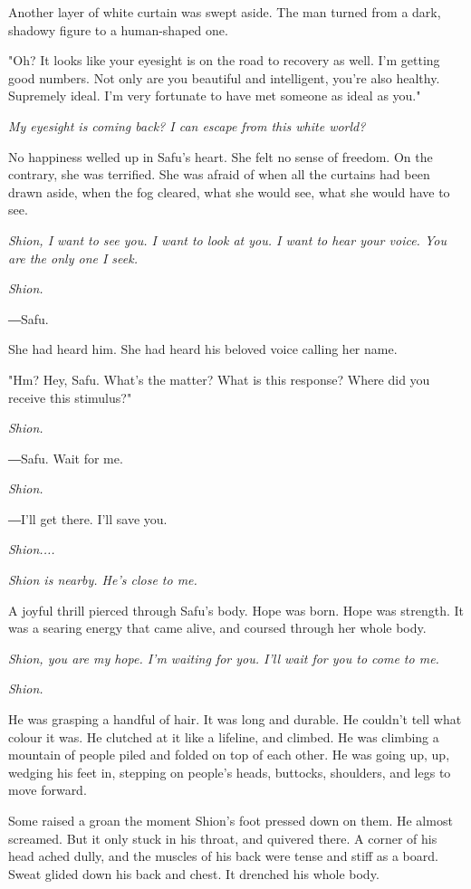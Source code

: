 Another layer of white curtain was swept aside. The man turned from a
dark, shadowy figure to a human-shaped one.

"Oh? It looks like your eyesight is on the road to recovery as well. I'm
getting good numbers. Not only are you beautiful and intelligent, you're
also healthy. Supremely ideal. I'm very fortunate to have met someone as
ideal as you."

\emph{My eyesight is coming back? I can escape from this white world?}

No happiness welled up in Safu's heart. She felt no sense of freedom. On
the contrary, she was terrified. She was afraid of when all the curtains
had been drawn aside, when the fog cleared, what she would see, what she
would have to see.

\emph{Shion, I want to see you. I want to look at you. I want to hear your
voice. You are the only one I seek.}

\emph{Shion.}

―Safu.

She had heard him. She had heard his beloved voice calling her name.

"Hm? Hey, Safu. What's the matter? What is this response? Where did you
receive this stimulus?"

\emph{Shion.}

―Safu. Wait for me.

\emph{Shion.}

―I'll get there. I'll save you.

\emph{Shion....}

\emph{Shion is nearby. He's close to me.}

A joyful thrill pierced through Safu's body. Hope was born. Hope was
strength. It was a searing energy that came alive, and coursed through
her whole body.

\emph{Shion, you are my hope. I'm waiting for you. I'll wait for you to come
to me.}

\emph{Shion.}

\mybreak

He was grasping a handful of hair. It was long and durable. He couldn't
tell what colour it was. He clutched at it like a lifeline, and climbed.
He was climbing a mountain of people piled and folded on top of each
other. He was going up, up, wedging his feet in, stepping on people's
heads, buttocks, shoulders, and legs to move forward.

Some raised a groan the moment Shion's foot pressed down on them. He
almost screamed. But it only stuck in his throat, and quivered there. A
corner of his head ached dully, and the muscles of his back were tense
and stiff as a board. Sweat glided down his back and chest. It drenched
his whole body.

